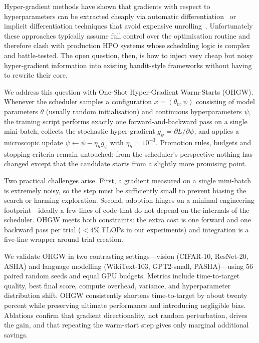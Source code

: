 \documentclass{article}
\begin{document}
Hyper-gradient methods have shown that gradients with respect to hyperparameters can be extracted cheaply via automatic differentiation~\cite{chandra-2019-gradient} or implicit differentiation techniques that avoid expensive unrolling~\cite{bertrand-2020-implicit}. Unfortunately these approaches typically assume full control over the optimisation routine and therefore clash with production HPO systems whose scheduling logic is complex and battle-tested. The open question, then, is how to inject very cheap but noisy hyper-gradient information into existing bandit-style frameworks without having to rewrite their core.

We address this question with One-Shot Hyper-Gradient Warm-Starts (OHGW). Whenever the scheduler samples a configuration \(x=(\theta_0,\psi)\) consisting of model parameters \(\theta\) (usually random initialisation) and continuous hyperparameters \(\psi\), the training script performs exactly one forward-and-backward pass on a single mini-batch, collects the stochastic hyper-gradient \(g_\psi=\partial L/\partial \psi\), and applies a microscopic update \(\psi \leftarrow \psi - \eta_h g_\psi\) with \(\eta_h = 10^{-3}\). Promotion rules, budgets and stopping criteria remain untouched; from the scheduler's perspective nothing has changed except that the candidate starts from a slightly more promising point.

Two practical challenges arise. First, a gradient measured on a single mini-batch is extremely noisy, so the step must be sufficiently small to prevent biasing the search or harming exploration. Second, adoption hinges on a minimal engineering footprint---ideally a few lines of code that do not depend on the internals of the scheduler. OHGW meets both constraints: the extra cost is one forward and one backward pass per trial (\(<4 \%\) FLOPs in our experiments) and integration is a five-line wrapper around trial creation.

We validate OHGW in two contrasting settings---vision (CIFAR-10, ResNet-20, ASHA) and language modelling (WikiText-103, GPT2-small, PASHA)---using 56 paired random seeds and equal GPU budgets. Metrics include time-to-target quality, best final score, compute overhead, variance, and hyperparameter distribution shift. OHGW consistently shortens time-to-target by about twenty percent while preserving ultimate performance and introducing negligible bias. Ablations confirm that gradient directionality, not random perturbation, drives the gain, and that repeating the warm-start step gives only marginal additional savings.
\end{document}
